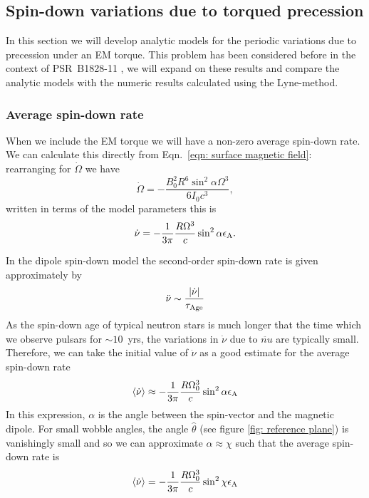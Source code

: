 \documentclass[../full_thesis/full_thesis.tex]{subfiles}
\begin{document}
\subsection{Spin-down variations due to torqued precession}
In this section we will develop analytic models for the periodic variations
due to precession under an EM torque. This problem has been considered before
in the context of PSR~B1828-11 \citep{Jones2001, Link2001, Akgun2006}, we will
expand on these results and compare the analytic models with the numeric
results calculated using the Lyne-method.

\subsubsection{Average spin-down rate}
When we include the EM torque we will have a non-zero average spin-down rate.
We can calculate this directly from Eqn.~\eqref{eqn: surface magnetic field}:
rearranging for $\dot{\Omega}$ we have
\begin{equation}
    \dot{\Omega} = -\frac{B_{0}^{2}R^{6} \sin^{2}\alpha \Omega^{3}}{6I_{0}c^{3}},
\end{equation}
written in terms of the model parameters this is
\begin{equation}
\dot{\nu} = -\frac{1}{3\pi}\frac{R \Omega^{3}}{c} \sin^{2}\alpha \epsilon_{\mathrm{A}}.
\end{equation}

In the dipole spin-down model the second-order spin-down rate is given
approximately by
\begin{align}
\ddot{\nu} \sim \frac{|\dot{\nu}|}{\tau_{\mathrm{Age}}}
\end{align}
As the spin-down age of typical neutron stars is much longer that
the time which we observe pulsars for $\sim 10$~yrs, the variations in $\dot{\nu}$
due to $\ddot{nu}$ are typically small. Therefore, we can take the initial value
of $\dot{\nu}$ as a good estimate for the average spin-down rate
\begin{align}
\langle\dot{\nu}\rangle \approx -\frac{1}{3\pi}\frac{R \Omega_{0}^{3}}{c} \sin^{2}\alpha \epsilon_{\mathrm{A}}
\label{eqn: spin-down initial EM}
\end{align}
In this expression, $\alpha$ is the angle between the spin-vector and the
magnetic dipole. For small wobble angles, the angle $\hat{\theta}$ (see figure
\ref{fig: reference plane}) is vanishingly small and so we can approximate
$\alpha \approx \chi$ such that the average spin-down rate is
\begin{equation}
    \langle \dot{\nu}\rangle = -\frac{1}{3\pi}\frac{R \Omega_{0}^{3}}{c} \sin^{2}\chi \epsilon_{\mathrm{A}}
    \label{eqn: spin-down average}
\end{equation}
\end{document}
